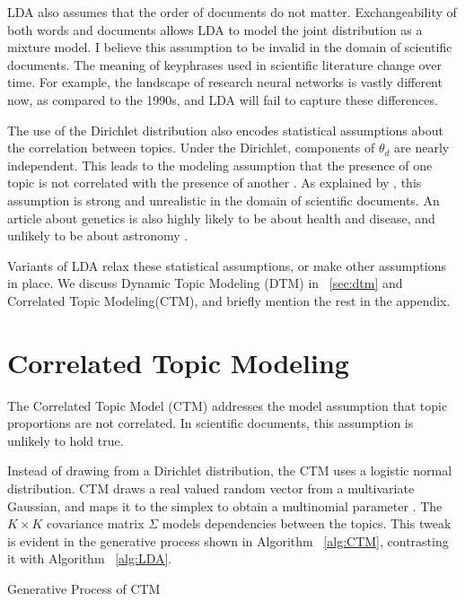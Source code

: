 \documentclass[letterpaper]{article}
\begin{document}
LDA also assumes that the order of documents do not matter.
Exchangeability of both words and documents allows LDA to model the
joint distribution as a mixture model. I believe this assumption to be
invalid in the domain of scientific documents. The meaning of
keyphrases used in scientific literature change over time. For
example, the landscape of research neural networks is vastly different
now, as compared to the 1990s, and LDA will fail to capture these
differences.

The use of the Dirichlet distribution also encodes statistical
assumptions about the correlation between topics. Under the Dirichlet,
components of $\theta_d$ are nearly independent. This leads to the
modeling assumption that the presence of one topic is not correlated
with the presence of another \cite{blei2007correlated}. As explained
by \citeauthor{blei2007correlated}, this assumption is strong and
unrealistic in the domain of scientific documents. An article about
genetics is also highly likely to be about health and disease, and
unlikely to be about astronomy \cite{blei2007correlated}.

Variants of LDA relax these statistical assumptions, or make other
assumptions in place. We discuss Dynamic Topic Modeling (DTM) in
~\autoref{sec:dtm} and Correlated Topic Modeling(CTM), and briefly
mention the rest in the appendix.

\section{Correlated Topic Modeling}
\label{sec:ctm}
The Correlated Topic Model (CTM) addresses the model assumption that
topic proportions are not correlated. In scientific documents, this
assumption is unlikely to hold true.

Instead of drawing from a Dirichlet distribution, the CTM uses a
logistic normal distribution. CTM draws a real valued random vector
from a multivariate Gaussian, and maps it to the simplex to obtain a
multinomial parameter \cite{blei2007correlated}. The $K \times K$
covariance matrix $\Sigma$ models dependencies between the topics.
This tweak is evident in the generative process shown in Algorithm
~\autoref{alg:CTM}, contrasting it with Algorithm ~\autoref{alg:LDA}.

\begin{algorithm}
  \caption{Generative Process of CTM}\label{alg:CTM}
  \begin{algorithmic}[1]
    \EndFor
    \EndFor
  \end{algorithmic}
\end{algorithm}
\end{document}
